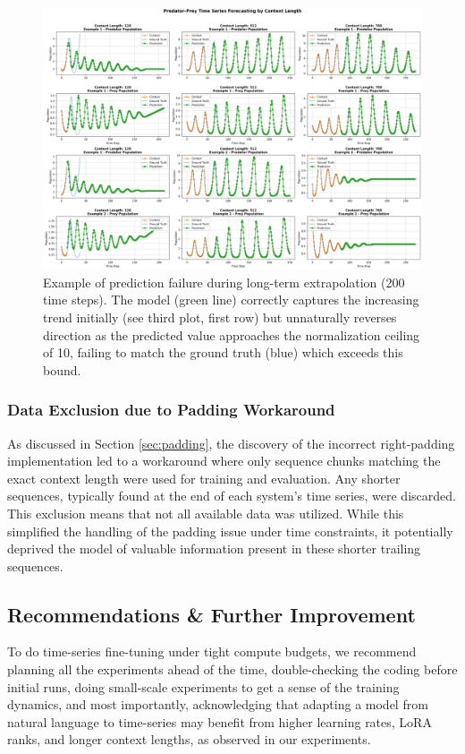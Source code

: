 \documentclass{article}
\begin{document}
\begin{figure}[!htbp] %
    \centering
    \includegraphics[width=0.9\linewidth]{M2 Course Work//Images/problem_long_sequence.png} %
    \caption{Example of prediction failure during long-term extrapolation (200 time steps). The model (green line) correctly captures the increasing trend initially (see third plot, first row) but unnaturally reverses direction as the predicted value approaches the normalization ceiling of 10, failing to match the ground truth (blue) which exceeds this bound.}
    \label{fig:long_term_prediction_failure} %
\end{figure}

\subsubsection{Data Exclusion due to Padding Workaround} %
As discussed in Section \ref{sec:padding}, the discovery of the incorrect right-padding implementation led to a workaround where only sequence chunks matching the exact context length were used for training and evaluation. Any shorter sequences, typically found at the end of each system's time series, were discarded. This exclusion means that not all available data was utilized. While this simplified the handling of the padding issue under time constraints, it potentially deprived the model of valuable information present in these shorter trailing sequences.

\subsection{Recommendations \& Further Improvement}
To do time-series fine-tuning under tight compute budgets, we recommend planning all the experiments ahead of the time, double-checking the coding before initial runs, doing small-scale experiments to get a sense of the training dynamics, and most importantly, acknowledging that adapting a model from natural language to time-series may benefit from higher learning rates, LoRA ranks, and longer context lengths, as observed in our experiments.
\end{document}
